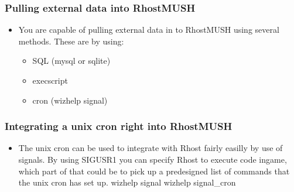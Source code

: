 \documentclass[letterpaper,10pt,english]{sphinxmanual}
\begin{document}
\subsubsection{Pulling external data into RhostMUSH}
\label{\detokenize{features:pulling-external-data-into-rhostmush}}\begin{itemize}
\item {} 
\sphinxAtStartPar
You are capable of pulling external data in to RhostMUSH using
several methods.  These are by using:
\begin{itemize}
\item {} 
\sphinxAtStartPar
SQL (mysql or sqlite)

\item {} 
\sphinxAtStartPar
execscript

\item {} 
\sphinxAtStartPar
cron (wizhelp signal)

\end{itemize}

\end{itemize}


\subsubsection{Integrating a unix cron right into RhostMUSH}
\label{\detokenize{features:integrating-a-unix-cron-right-into-rhostmush}}\begin{itemize}
\item {} 
\sphinxAtStartPar
The unix cron can be used to integrate with Rhost fairly
easilly by use of signals.  By using SIGUSR1 you can specify
Rhost to execute code in\sphinxhyphen{}game, which part of that could be
to pick up a pre\sphinxhyphen{}designed list of commands that the unix cron
has set up.
\sphinxhyphen{} wizhelp signal
\sphinxhyphen{} wizhelp signal\_cron

\end{itemize}
\end{document}
